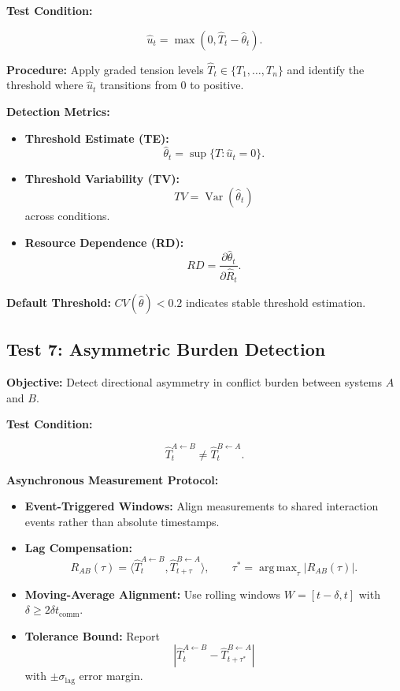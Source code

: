 \documentclass[11pt,a4paper]{article}
\DeclareMathOperator{\Var}{Var}
\DeclareMathOperator*{\argmax}{arg\,max}
\theoremstyle{breakstyle}
\newcommand{\That}{\widehat{T}}
\newcommand{\Rhat}{\widehat{R}}
\newcommand{\thetahat}{\widehat{\theta}}
\newcommand{\uhat}{\widehat{u}}
\begin{document}
	\textbf{Test Condition:}
	
	\[
	\uhat_t = \max(0,\That_t-\thetahat_t).
	\]
	
	\textbf{Procedure:} Apply graded tension levels $\That_t \in \{T_1,\dots,T_n\}$ and identify the threshold where $\uhat_t$ transitions from $0$ to positive.
	
	\textbf{Detection Metrics:}
	\begin{itemize}
		\item \textbf{Threshold Estimate (TE):}
		\[
		\thetahat_t =
		\sup\{T : \uhat_t = 0\}.
		\]
		
		\item \textbf{Threshold Variability (TV):}
		\[
		TV = \Var(\thetahat_t)
		\]
		across conditions.
		
		\item \textbf{Resource Dependence (RD):}
		\[
		RD =
		\frac{\partial \thetahat_t}{\partial \Rhat_t}.
		\]
	\end{itemize}
	
	\textbf{Default Threshold:} $CV(\thetahat) < 0.2$ indicates stable threshold estimation.
	
	\subsection*{Test 7: Asymmetric Burden Detection}
	
	\textbf{Objective:} Detect directional asymmetry in conflict burden between systems $A$ and $B$.
	
	\textbf{Test Condition:}
	
	\[
	\That^{A \leftarrow B}_t
	\neq
	\That^{B \leftarrow A}_t.
	\]
	
	\textbf{Asynchronous Measurement Protocol:}
	\begin{itemize}
		\item \textbf{Event-Triggered Windows:} Align measurements to shared interaction events rather than absolute timestamps.
		\item \textbf{Lag Compensation:}
		\[
		R_{AB}(\tau)
		=
		\langle
		\That^{A \leftarrow B}_t,
		\That^{B \leftarrow A}_{t+\tau}
		\rangle,
		\qquad
		\tau^* = \argmax_{\tau}|R_{AB}(\tau)|.
		\]
		\item \textbf{Moving-Average Alignment:} Use rolling windows $W=[t-\delta,t]$ with $\delta \geq 2\delta t_{\mathrm{comm}}$.
		\item \textbf{Tolerance Bound:} Report
		\[
		|\That^{A \leftarrow B}_{t}
		-
		\That^{B \leftarrow A}_{t+\tau^*}|
		\]
		with $\pm \sigma_{\mathrm{lag}}$ error margin.
	\end{itemize}
	
\end{document}
